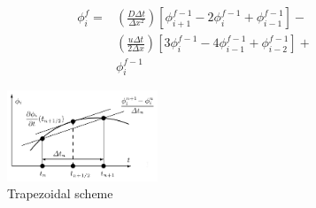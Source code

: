 \documentclass[twocolumn,10pt]{asme2ej}
\begin{document}
\begin{equation}
\label{upwind_eqn}
\begin{split}
\phi_i ^f = & \left( \frac{D \Delta t}{\Delta x^2} \right) \left[ \phi_{i+1} ^{f-1} - 2 \phi_{i} ^{f-1} + \phi_{i-1} ^{f-1} \right] - \\
            & \left( \frac{u \Delta t}{2 \Delta x} \right) \left[ 3 \phi_{i} ^{f-1} - 4 \phi_{i-1} ^{f-1} + \phi_{i-2} ^{f-1} \right] + \\
            & \phi_i ^{f-1}
\end{split}
\end{equation}

\begin{figure}[thb]
\begin{center}
\includegraphics[width=0.4\textwidth]{figure/Trapezoidal (time derivative).png}
\caption{Trapezoidal scheme}
\label{Trapezoidal_scheme}
\end{center}
\end{figure}
\end{document}

